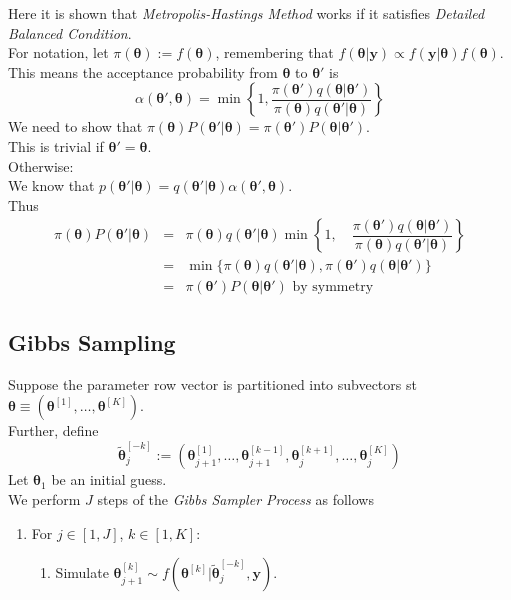 \documentclass[11pt,a4paper]{article}
\begin{document}
Here it is shown that \textit{Metropolis-Hastings Method} works if it satisfies \textit{Detailed Balanced Condition}.\\
For notation, let $\pi(\pmb\theta):=f(\pmb\theta)$, remembering that $f(\pmb\theta|\textbf{y})\propto f(\textbf{y}|\pmb\theta)f(\pmb\theta)$.\\
This means the acceptance probability from $\pmb\theta$ to $\pmb\theta'$ is
$$\alpha(\pmb\theta',\pmb\theta)=\min\left\{1,\dfrac{\pi(\pmb\theta')q(\pmb\theta|\pmb\theta')}{\pi(\pmb\theta)q(\pmb\theta'|\pmb\theta)}\right\}$$
We need to show that $\pi(\pmb\theta)P(\pmb\theta'|\pmb\theta)=\pi(\pmb\theta')P(\pmb\theta|\pmb\theta')$.\\
This is trivial if $\pmb\theta'=\pmb\theta$.\\
Otherwise:\\
We know that $p(\pmb\theta'|\pmb\theta)=q(\pmb\theta'|\pmb\theta)\alpha(\pmb\theta',\pmb\theta)$.\\
Thus
\[\begin{array}{rcl}
\pi(\pmb\theta)P(\pmb\theta'|\pmb\theta)&=&\pi(\pmb\theta)q(\pmb\theta'|\pmb\theta)\min\left\{1,\quad\dfrac{\pi(\pmb\theta')q(\pmb\theta|\pmb\theta')}{\pi(\pmb\theta)q(\pmb\theta'|\pmb\theta)}\right\}\\
&=&\min\{\pi(\pmb\theta)q(\pmb\theta'|\pmb\theta),\pi(\pmb\theta')q(\pmb\theta|\pmb\theta')\}\\
&=&\pi(\pmb\theta')P(\pmb\theta|\pmb\theta')\text{ by symmetry}
\end{array}\]
\proved

\subsection{Gibbs Sampling}

Suppose the parameter row vector is partitioned into subvectors st $\pmb\theta\equiv(\pmb\theta^{[1]},\dots,\pmb\theta^{[K]})$.\\
Further, define $$\tilde{\pmb\theta}_j^{[-k]}:=(\pmb\theta_{j+1}^{[1]},\dots,\pmb\theta_{j+1}^{[k-1]},\pmb\theta_{j}^{[k+1]},\dots,\pmb\theta_{j}^{[K]})$$
Let $\pmb\theta_1$ be an initial guess.\\
We perform $J$ steps of the \textit{Gibbs Sampler Process} as follows
\begin{enumerate}
	\item For $j\in[1,J]$, $k\in[1,K]$:
	\begin{enumerate}
		\item Simulate $\pmb\theta_{j+1}^[k]\sim f(\pmb\theta^{[k]}|\tilde{\pmb\theta}_j^{[-k]},\textbf{y})$.\\
		\nb {}
	\end{enumerate}
\end{enumerate}
\end{document}
